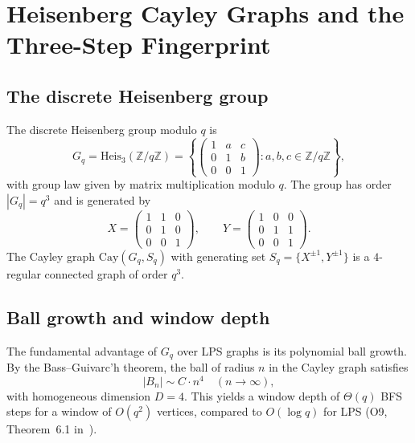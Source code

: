 \documentclass[11pt,a4paper]{article}
\newcommand{\Heis}{\mathrm{Heis}_3(\mathbb{Z}/q\mathbb{Z})}
\begin{document}
  \section{Heisenberg Cayley Graphs and the Three-Step Fingerprint}
  \label{sec:heisenberg}

  \subsection{The discrete Heisenberg group}
    \label{sec:heis-group}

    The discrete Heisenberg group modulo $q$ is
    \begin{equation}
      \label{eq:heis-def}
      G_q = \Heis = \left\{
                      \begin{pmatrix}
                        1 & a & c \\ 0 & 1 & b \\ 0 & 0 & 1
                      \end{pmatrix}
                      : a, b, c \in \mathbb{Z}/q\mathbb{Z}
      \right\},
    \end{equation}
    with group law given by matrix multiplication modulo $q$.
    The group has order $|G_q| = q^3$ and is generated by
    \begin{equation}
      \label{eq:generators}
      X = \begin{pmatrix}
            1 & 1 & 0 \\ 0 & 1 & 0 \\ 0 & 0 & 1
      \end{pmatrix},
      \qquad
      Y = \begin{pmatrix}
            1 & 0 & 0 \\ 0 & 1 & 1 \\ 0 & 0 & 1
      \end{pmatrix}.
    \end{equation}
    The Cayley graph $\mathrm{Cay}(G_q, S_q)$ with generating set
    $S_q = \{X^{\pm 1}, Y^{\pm 1}\}$ is a $4$-regular connected graph of order $q^3$.

  \subsection{Ball growth and window depth}
    \label{sec:ball-growth}

    The fundamental advantage of $G_q$ over LPS graphs is its polynomial ball growth.
    By the Bass--Guivarc'h theorem, the ball of radius $n$ in the Cayley graph satisfies
    \begin{equation}
      \label{eq:ball-growth}
      |B_n| \sim C \cdot n^4 \quad (n \to \infty),
    \end{equation}
    with homogeneous dimension $D = 4$.
    This yields a window depth of $\Theta(q)$ BFS steps for a window of $O(q^2)$ vertices,
    compared to $O(\log q)$ for LPS (O9, Theorem~6.1 in~\cite{Beau2026a13}).
\end{document}
